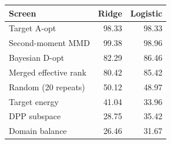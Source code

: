\begin{tabular}{lrr}
\toprule
Screen & Ridge & Logistic\\
\midrule
Target A-opt & 98.33 & 98.33 \\
Second-moment MMD & 99.38 & 98.96 \\
Bayesian D-opt & 82.29 & 86.46 \\
Merged effective rank & 80.42 & 85.42 \\
Random (20 repeats) & 50.12 & 48.97 \\
Target energy & 41.04 & 33.96 \\
DPP subspace & 28.75 & 35.42 \\
Domain balance & 26.46 & 31.67 \\
\bottomrule
\end{tabular}
